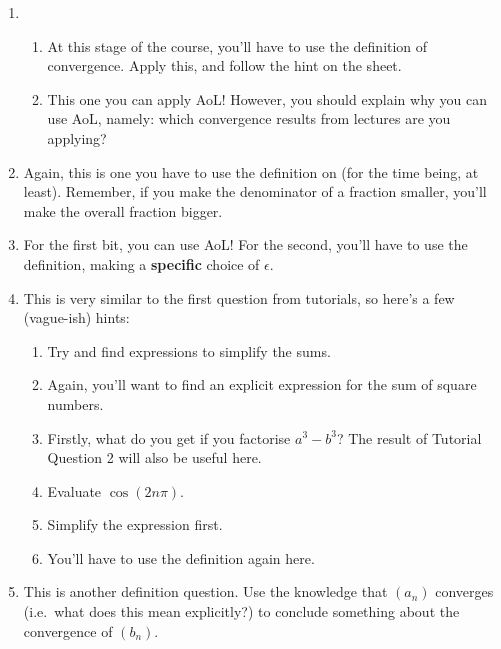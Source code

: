 \documentclass[
  17pt,
  a4paper]{extarticle}
\providecommand{\tightlist}{%
  \setlength{\itemsep}{0pt}\setlength{\parskip}{0pt}}
\theoremstyle{plain}
\theoremstyle{definition}
\theoremstyle{plain}
\theoremstyle{plain}
\theoremstyle{plain}
\theoremstyle{plain}
\theoremstyle{definition}
\theoremstyle{definition}
\theoremstyle{remark}
\theoremstyle{remark}
\renewcommand{\;}{\,}
\begin{document}
\begin{enumerate}
\def\labelenumi{\arabic{enumi}.}
\item
  \begin{enumerate}
  \def\labelenumii{\roman{enumii})}
  \tightlist
  \item
    At this stage of the course, you'll have to use the definition of convergence. Apply this, and follow the hint on the sheet.
  \item
    This one you can apply AoL! However, you should explain why you can use AoL, namely: which convergence results from lectures are you applying?
  \end{enumerate}
\item
  Again, this is one you have to use the definition on (for the time being, at least). Remember, if you make the denominator of a fraction smaller, you'll make the overall fraction bigger.
\item
  For the first bit, you can use AoL! For the second, you'll have to use the definition, making a \textbf{specific} choice of \(\epsilon.\)
\item
  This is very similar to the first question from tutorials, so here's a few (vague-ish) hints:

  \begin{enumerate}
  \def\labelenumii{\roman{enumii})}
  \tightlist
  \item
    Try and find expressions to simplify the sums.
  \item
    Again, you'll want to find an explicit expression for the sum of square numbers.
  \item
    Firstly, what do you get if you factorise \(a^3 - b^3\)? The result of Tutorial Question 2 will also be useful here.
  \item
    Evaluate \(\cos(2n\pi).\)
  \item
    Simplify the expression first.
  \item
    You'll have to use the definition again here.
  \end{enumerate}
\item
  This is another definition question. Use the knowledge that \((a_n)\) converges (i.e.~what does this mean explicitly?) to conclude something about the convergence of \((b_n)\).
\end{enumerate}
\end{document}
